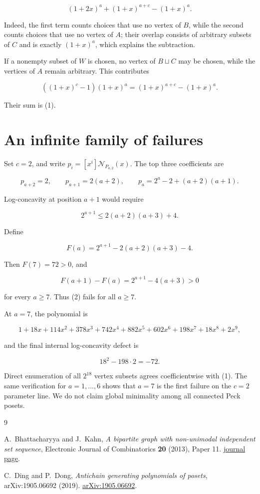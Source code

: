 \documentclass[11pt]{article}
\numberwithin{equation}{section}
\begin{document}
\[
(1+2x)^a+(1+x)^{a+c}-(1+x)^a.
\]

Indeed, the first term counts choices that use no vertex of $B$, while the second counts choices
that use no vertex of $A$; their overlap consists of arbitrary subsets of $C$ and is exactly
$(1+x)^a$, which explains the subtraction.

If a nonempty subset of $W$ is chosen, no vertex of $B\sqcup C$ may be chosen, while the vertices
of $A$ remain arbitrary. This contributes

\[
((1+x)^c-1)(1+x)^a=(1+x)^{a+c}-(1+x)^a.
\]

Their sum is (1).

\section{An infinite family of failures}


Set $c=2$, and write $p_i=[x^i]\mathcal N_{P_{a,2}}(x)$. The top three coefficients are

\[
p_{a+2}=2,\qquad p_{a+1}=2(a+2),\qquad
p_a=2^a-2+(a+2)(a+1).
\]

Log-concavity at position $a+1$ would require

\[
2^{a+1}\leq 2(a+2)(a+3)+4.
\tag{2}
\]

Define

\[
F(a)=2^{a+1}-2(a+2)(a+3)-4.
\]

Then $F(7)=72>0$, and

\[
F(a+1)-F(a)=2^{a+1}-4(a+3)>0
\]

for every $a\geq 7$. Thus (2) fails for all $a\geq 7$.

At $a=7$, the polynomial is

\[
1+18x+114x^2+378x^3+742x^4+882x^5+602x^6+198x^7+18x^8+2x^9,
\]

and the final internal log-concavity defect is

\[
18^2-198\cdot2=-72.
\]

Direct enumeration of all $2^{18}$ vertex subsets agrees coefficientwise with (1). The same
verification for $a=1,\ldots,6$ shows that $a=7$ is the first failure on the $c=2$ parameter
line. We do not claim global minimality among all connected Peck posets.

\begin{thebibliography}{9}
\footnotesize
\raggedright

A.~Bhattacharyya and J.~Kahn,
\emph{A bipartite graph with non-unimodal independent set sequence},
Electronic Journal of Combinatorics \textbf{20} (2013), Paper 11.
\href{https://www.combinatorics.org/ojs/index.php/eljc/article/view/v20i4p11}{journal page}.

C.~Ding and P.~Dong,
\emph{Antichain generating polynomials of posets},
arXiv:1905.06692 (2019).
\href{https://arxiv.org/abs/1905.06692}{arXiv:1905.06692}.

\end{thebibliography}
\end{document}

